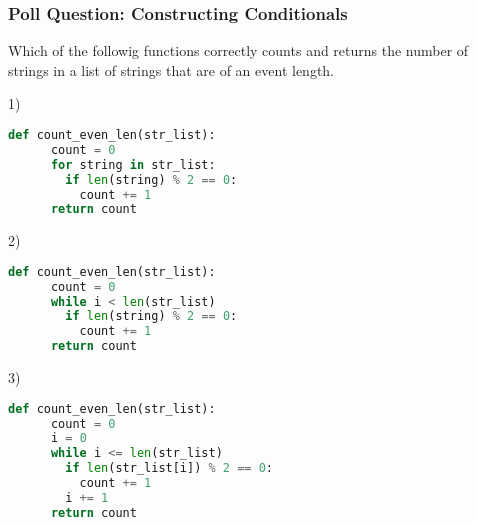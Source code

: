 \documentclass{beamer}
\begin{document}
%
%
\begin{frame}[fragile]
	\frametitle{Poll Question: Constructing Conditionals}
  Which of the followig functions correctly counts and returns the number of strings in a list of strings that are of an event length.
	\vfill
	\begin{minipage}{0.49\textwidth}
    1)
		\begin{lstlisting}[language=Python, autogobble,basicstyle=\tiny,numbers=none]
    def count_even_len(str_list):
      count = 0 
      for string in str_list:
        if len(string) % 2 == 0:
          count += 1
      return count
		\end{lstlisting}
	\end{minipage}
	\begin{minipage}{0.49\textwidth}
    2)
		\begin{lstlisting}[language=Python, autogobble,basicstyle=\tiny,numbers=none]
    def count_even_len(str_list):
      count = 0 
      while i < len(str_list)
        if len(string) % 2 == 0:
          count += 1
      return count
		\end{lstlisting}
	\end{minipage}
  \vfill
  \centering
  \begin{minipage}{0.45\textwidth}
    3)
    \begin{lstlisting}[language=Python, autogobble,basicstyle=\tiny,numbers=none]
    def count_even_len(str_list):
      count = 0 
      i = 0
      while i <= len(str_list)
        if len(str_list[i]) % 2 == 0:
          count += 1
        i += 1
      return count
    \end{lstlisting}
  \end{minipage}
\end{frame}
\end{document}
